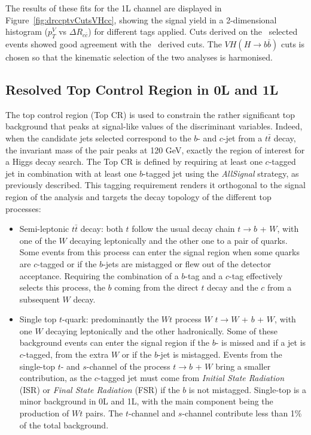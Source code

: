 The results of these fits for the 1L channel are displayed in Figure~\ref{fig:drccptvCutsVHcc}, showing the signal yield in a 2-dimensional histogram ($p_T^V$ vs $\Delta R_{c\bar{c}}$) for different tags applied. Cuts derived on the \vhc\ selected events showed good agreement with the \vhb\ derived cuts. The $VH(H\rightarrow b\bar{b})$ cuts is chosen so that the kinematic selection of the two analyses is harmonised. \\

\subsection{Resolved Top Control Region in 0L and 1L}
The top control region (Top CR) is used to constrain the rather significant top background that peaks at signal-like values of the discriminant variables. Indeed, when the candidate jets selected correspond to the $b$- and $c$-jet from a $t\bar{t}$ decay, the invariant mass of the pair peaks at 120 GeV, exactly the region of interest for a Higgs decay search. The Top CR is defined by requiring at least one $c$-tagged jet in combination with at least one $b$-tagged jet using the \textit{AllSignal} strategy, as previously described. This tagging requirement renders it orthogonal to the signal region of the analysis and targets the decay topology of the different top processes: 
\begin{itemize}
\item Semi-leptonic $t\bar{t}$ decay: both $t$ follow the usual decay chain  $t \rightarrow b$ + $W$, with one of the $W$ decaying leptonically and the other one to a pair of quarks. Some events from this process can enter the signal region when some quarks are $c$-tagged or if the $b$-jets are mistagged or flew out of the detector acceptance. Requiring the combination of a $b$-tag and a $c$-tag effectively selects this process, the $b$ coming from the direct $t$ decay and the $c$ from a subsequent $W$ decay. 
\item Single top $t$-quark: predominantly the $Wt$ process $W$ $t \rightarrow W$ +  $b$ + $W$, with one $W$ decaying leptonically and the other hadronically. Some of these background events can enter the signal region if the $b$- is missed and if a jet is $c$-tagged, from the extra $W$ or if the $b$-jet is mistagged. Events from the single-top $t$- and $s$-channel of the process $t \rightarrow b$ + $W$ bring a smaller contribution, as the $c$-tagged jet must come from \textit{Initial State Radiation} (ISR) or \textit{Final State Radiation} (FSR) if the $b$ is not mistagged. Single-top is a minor background in 0L and 1L, with the main component being the production of $Wt$ pairs. The $t$-channel and $s$-channel contribute less than 1\% of the total background.
\end{itemize}

